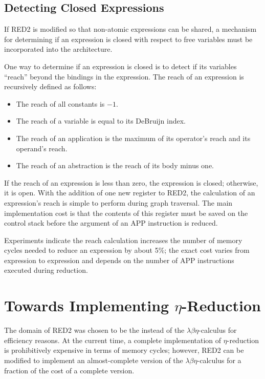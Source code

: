\subsection{Detecting Closed Expressions}

If RED2 is modified so that non-atomic expressions can be shared, a mechanism
for determining if an expression is closed with respect to free variables must
be incorporated into the architecture.

One way to determine if an expression is closed is to detect if its variables
``reach'' beyond the bindings in the expression. The reach of an expression is
recursively defined as follows:

\begin{itemize}
\item The reach of all constants is \(-1\).
\item The reach of a variable is equal to its DeBruijn index.
\item The reach of an application is the maximum of its operator's reach and its
operand's reach.
\item The reach of an abstraction is the reach of its body minus one.
\end{itemize}

If the reach of an expression is less than zero, the expression is closed;
otherwise, it is open. With the addition of one new register to RED2, the
calculation of an expression's reach is simple to perform during graph
traversal. The main implementation cost is that the contents of this register
must be saved on the control stack before the argument of an APP instruction is
reduced.

Experiments indicate the reach calculation increases the number of memory cycles
needed to reduce an expression by about 5\%; the exact cost varies from
expression to expression and depends on the number of APP instructions executed
during reduction.

\section{Towards Implementing \(\eta\)-Reduction}

The domain of RED2 was chosen to be the \lambdabetacalculus{} instead of the
\(\lambda\beta\eta\)-calculus for efficiency reasons. At the current time, a
complete implementation of \(\eta\)-reduction is prohibitively expensive in terms
of memory cycles; however, RED2 can be modified to implement an almost-complete
version of the \(\lambda\beta\eta\)-calculus for a fraction of the cost of a
complete version.

